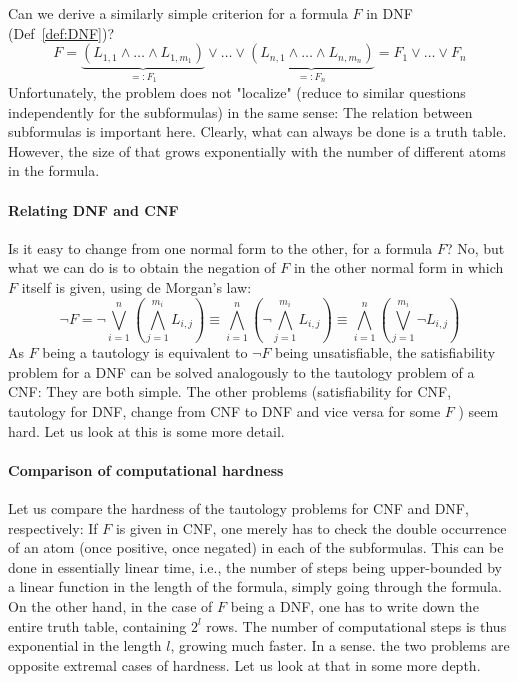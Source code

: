 \begin{example}
Can we derive a similarly simple criterion for a formula $F$ in DNF (Def~\ref{def:DNF})?
$$
F = \underbrace{(L_{1,1} \wedge \ldots \wedge L_{1, m_1})}_{=: F_1} \vee \ldots \vee \underbrace{(L_{n, 1} \wedge \ldots \wedge L_{n, m_n})}_{=: F_n} = F_1 \vee \ldots \vee F_n
$$
Unfortunately, the problem does not "localize" (reduce to similar questions independently for the subformulas) in the same sense: 
The relation between subformulas is important here. 
Clearly, what can always be done is a truth table. 
However, the size of that grows exponentially with the number of different atoms in the formula.
\end{example}  

\paragraph{Relating DNF and CNF}
Is it easy to change from one normal form to the other, for a formula $F$? 
No, but what we can do is to obtain the negation of $F$ in the other normal form in which $F$ itself is given, using de Morgan's law:
$$
\neg F = \neg \bigvee_{i=1}^n\left(\bigwedge_{j=1}^{m_i} L_{i, j}\right) \equiv \bigwedge_{i=1}^n\left(\neg \bigwedge_{j=1}^{m_i} L_{i, j}\right) \equiv \bigwedge_{i=1}^n\left(\bigvee_{j=1}^{m_i} \neg L_{i, j}\right)
$$
As $F$ being a tautology is equivalent to $\neg F$ being unsatisfiable, the satisfiability problem for a DNF can be solved analogously to the tautology problem of a CNF: 
They are both simple.
The other problems (satisfiability for CNF, tautology for DNF, change from CNF to DNF and vice versa for some $F$ ) seem hard. 
Let us look at this is some more detail.

\paragraph{Comparison of computational hardness}
Let us compare the hardness of the tautology problems for CNF and DNF, respectively:
If $F$ is given in CNF, one merely has to check the double occurrence of an atom (once positive, once negated) in each of the subformulas. 
This can be done in essentially linear time, i.e., the number of steps being upper-bounded by a linear function in the length of the formula, simply going through the formula. 
On the other hand, in the case of $F$ being a DNF, one has to write down the entire truth table, containing $2^l$ rows. 
The number of computational steps is thus exponential in the length $l$, growing much faster. In a sense. the two problems are opposite extremal cases of hardness. 
Let us look at that in some more depth.



